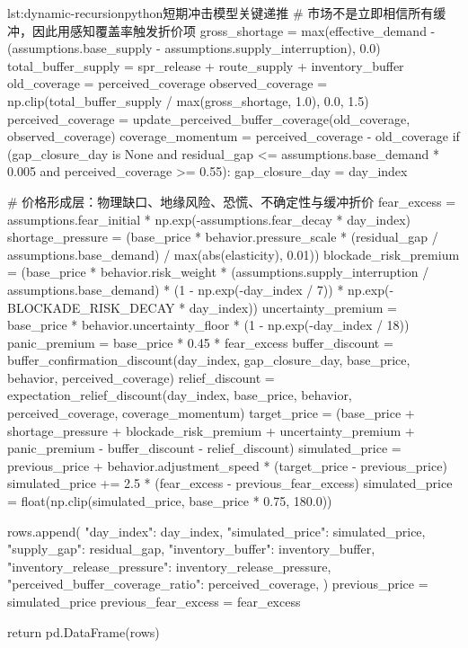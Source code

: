 \begin{paperlisting}{lst:dynamic-recursion}{python}{短期冲击模型关键递推}
        # 市场不是立即相信所有缓冲，因此用感知覆盖率触发折价项
        gross_shortage = max(effective_demand - (assumptions.base_supply
                                                 - assumptions.supply_interruption), 0.0)
        total_buffer_supply = spr_release + route_supply + inventory_buffer
        old_coverage = perceived_coverage
        observed_coverage = np.clip(total_buffer_supply / max(gross_shortage, 1.0), 0.0, 1.5)
        perceived_coverage = update_perceived_buffer_coverage(old_coverage, observed_coverage)
        coverage_momentum = perceived_coverage - old_coverage
        if (gap_closure_day is None
                and residual_gap <= assumptions.base_demand * 0.005
                and perceived_coverage >= 0.55):
            gap_closure_day = day_index

        # 价格形成层：物理缺口、地缘风险、恐慌、不确定性与缓冲折价
        fear_excess = assumptions.fear_initial * np.exp(-assumptions.fear_decay * day_index)
        shortage_pressure = (base_price * behavior.pressure_scale
                             * (residual_gap / assumptions.base_demand)
                             / max(abs(elasticity), 0.01))
        blockade_risk_premium = (base_price * behavior.risk_weight
                                 * (assumptions.supply_interruption / assumptions.base_demand)
                                 * (1 - np.exp(-day_index / 7))
                                 * np.exp(-BLOCKADE_RISK_DECAY * day_index))
        uncertainty_premium = base_price * behavior.uncertainty_floor * (1 - np.exp(-day_index / 18))
        panic_premium = base_price * 0.45 * fear_excess
        buffer_discount = buffer_confirmation_discount(day_index, gap_closure_day,
                                                       base_price, behavior, perceived_coverage)
        relief_discount = expectation_relief_discount(day_index, base_price, behavior,
                                                      perceived_coverage, coverage_momentum)
        target_price = (base_price + shortage_pressure + blockade_risk_premium
                        + uncertainty_premium + panic_premium
                        - buffer_discount - relief_discount)
        simulated_price = previous_price + behavior.adjustment_speed * (target_price - previous_price)
        simulated_price += 2.5 * (fear_excess - previous_fear_excess)
        simulated_price = float(np.clip(simulated_price, base_price * 0.75, 180.0))

        rows.append({
            "day_index": day_index,
            "simulated_price": simulated_price,
            "supply_gap": residual_gap,
            "inventory_buffer": inventory_buffer,
            "inventory_release_pressure": inventory_release_pressure,
            "perceived_buffer_coverage_ratio": perceived_coverage,
        })
        previous_price = simulated_price
        previous_fear_excess = fear_excess

    return pd.DataFrame(rows)
\end{paperlisting}

